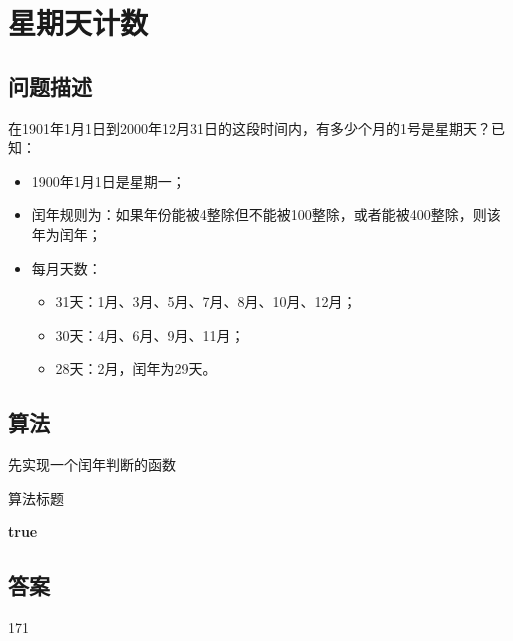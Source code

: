 \section{星期天计数}
\subsection{问题描述}
\begin{tcolorbox}
在1901年1月1日到2000年12月31日的这段时间内，有多少个月的1号是星期天？已知：
\begin{itemize}
    \item 1900年1月1日是星期一；
    \item 闰年规则为：如果年份能被4整除但不能被100整除，或者能被400整除，则该年为闰年；
    \item 每月天数：
    \begin{itemize}
        \item 31天：1月、3月、5月、7月、8月、10月、12月；
        \item 30天：4月、6月、9月、11月；
        \item 28天：2月，闰年为29天。
    \end{itemize}
\end{itemize}
\end{tcolorbox}

\subsection{算法}
先实现一个闰年判断的函数
\begin{algorithm}
	\caption{算法标题}
	\begin{algorithmic}[1]
		\Return \textbf{true}
	\EndIf
	\end{algorithmic}
\end{algorithm}

\subsection{答案}
171
